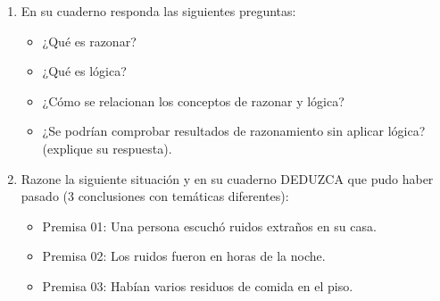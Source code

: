\documentclass[letterpaper,10pt,spanish]{sphinxmanual}
\let\sphinxpxdimen\pdfpxdimen\else\newdimen\sphinxpxdimen
\begin{document}
\begin{enumerate}
\begin{itemize}
\end{itemize}


\begin{savenotes}\sphinxattablestart
\sphinxthistablewithglobalstyle
\centering
\begin{tabulary}{\linewidth}[t]{T}
\sphinxtoprule
\sphinxtableatstartofbodyhook

\begin{sphinxfigure-in-table}
\centering
\capstart
\noindent\sphinxincludegraphics[width=300\sphinxpxdimen]{{image058}.png}
\label{\detokenize{1_guias/8logica/G821:id17}}\end{sphinxfigure-in-table}\relax
\\
\sphinxbottomrule
\end{tabulary}
\sphinxtableafterendhook\par
\sphinxattableend\end{savenotes}

\item {} 
\sphinxAtStartPar
En su cuaderno responda las siguientes preguntas:
\begin{itemize}
\item {} 
\sphinxAtStartPar
¿Qué es razonar?

\item {} 
\sphinxAtStartPar
¿Qué es lógica?

\item {} 
\sphinxAtStartPar
¿Cómo se relacionan los conceptos de razonar y lógica?

\item {} 
\sphinxAtStartPar
¿Se podrían comprobar resultados de razonamiento sin aplicar lógica? (explique su respuesta).

\end{itemize}

\item {} 
\sphinxAtStartPar
Razone la siguiente situación y en su cuaderno DEDUZCA que pudo haber pasado (3 conclusiones con temáticas diferentes):
\begin{itemize}
\item {} 
\sphinxAtStartPar
Premisa 01: Una persona escuchó ruidos extraños en su casa.

\item {} 
\sphinxAtStartPar
Premisa 02: Los ruidos fueron en horas de la noche.

\item {} 
\sphinxAtStartPar
Premisa 03: Habían varios residuos de comida en el piso.


\end{itemize}
\end{enumerate}
\end{document}
